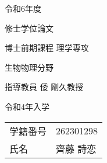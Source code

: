 \begin{titlepage}
    \fontsize{30pt}{30pt} \selectfont

    \centering
    令和6年度
    \vspace{15pt}

    修士学位論文
    \vspace{45pt}

    博士前期課程 理学専攻
    \vspace{20pt}

    生物物理分野
    \vspace{45pt}

    指導教員 倭 剛久教授
    \vspace{45pt}

    令和4年入学
    \vspace{15pt}

    \begin{tabular}{ll}
        学籍番号 & 262301298 \\
        氏名   & 齊藤 詩恋 \\
    \end{tabular}
    \normalsize

\end{titlepage}